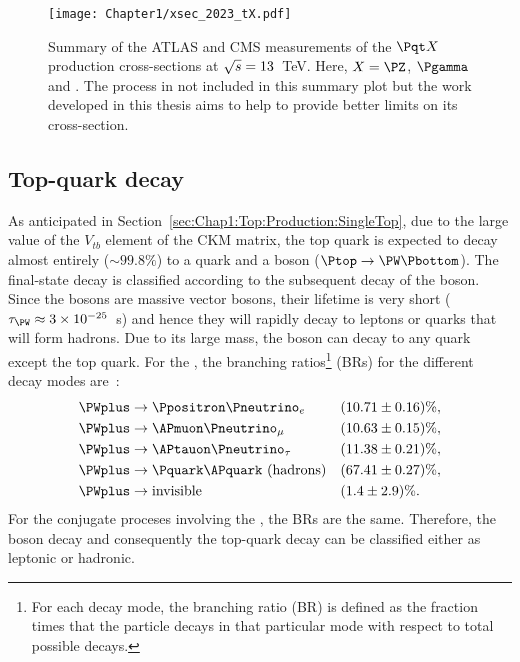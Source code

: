\begin{figure}
    \centering
    \texttt{[image: Chapter1/xsec\_2023\_tX.pdf]}
    \caption{Summary of the ATLAS and CMS measurements of the $\tX$ production 
    cross-sections at $\sqrt{s} =13$~TeV. Here, $X=\PZ$, $\Pgamma$ and \PW. The \tHq process 
    in not included in this summary plot but the work developed in this thesis aims to help
    to provide better limits on its cross-section.} %
    \label{fig:Chap1:top:tX:Cross-Sec}
\end{figure}







\subsection{Top-quark decay}
As anticipated in Section~\ref{sec:Chap1:Top:Production:SingleTop}, due to the large 
value of the $V_{tb}$ element of the CKM matrix, the 
top quark is expected to decay almost entirely ($\sim 99.8 \%$) %
to a \Pbottom quark and a \PW boson ($\Ptop \rightarrow \PW \Pbottom$).
The final-state decay is classified according to the subsequent decay of the \PW boson.
Since the \PW bosons are massive vector bosons,
their lifetime is very short ($\tau_{\PW} \approx 3\times10^{-25}$~s) and hence they will
rapidly decay to leptons or quarks that will form hadrons. 
Due to its large mass, the \PW boson can decay to any quark except the top quark. 
For the \PWplus, the branching ratios\footnote{For each decay mode, the branching ratio (BR) is defined as the fraction times that the particle decays in that particular mode with respect to total possible decays.} (BRs) for the different decay modes are~\cite{Workman:2022ynf}:
\begin{align*}
	\PWplus &\rightarrow \Ppositron \Pneutrino_{e} 			&& (10.71 \pm 0.16)\%, \\
	\PWplus &\rightarrow \APmuon \Pneutrino_{\mu} 			&& (10.63 \pm 0.15)\%, \\
	\PWplus &\rightarrow \APtauon \Pneutrino_{\tau} 			&& (11.38 \pm 0.21)\%, \\
	\PWplus &\rightarrow \Pquark \APquark \textrm{ (hadrons)}	&& (67.41 \pm 0.27)\%, \\
	\PWplus &\rightarrow \textrm{invisible}					&& (1.4 \pm 2.9)\% .
\end{align*} 
For the conjugate proceses involving the \PWminus, the BRs are the same. Therefore, the \PW boson decay 
and consequently the top-quark decay can be classified either as leptonic or hadronic. 


